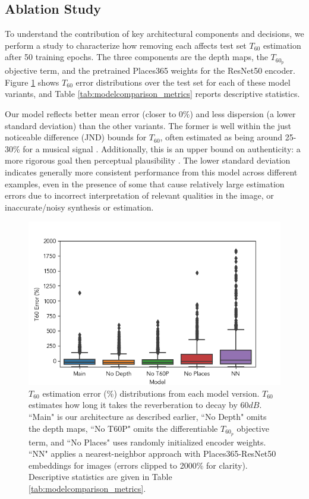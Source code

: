 \documentclass[10pt,twocolumn,letterpaper]{article}
\begin{document}
\subsection{Ablation Study}
To understand the contribution of key architectural components and decisions, we perform a study to characterize how removing each affects test set $T_{60}$ estimation after 50 training epochs. The three components are the depth maps, the $T_{60_p}$ objective term, and the pretrained Places365 weights for the ResNet50 encoder. Figure \ref{fig:models_comparison} shows $T_{60}$ error distributions over the test set for each of these model variants, and Table \ref{tab:modelcomparison_metrics} reports descriptive statistics.

Our model reflects better mean error (closer to 0\%) and less dispersion (a lower standard deviation) than the other variants. The former is well within the just noticeable difference (JND) bounds for $T_{60}$, often estimated as being around 25-30\% for a musical signal \cite{jndt60}. Additionally, this is an upper bound on authenticity: a more rigorous goal then perceptual plausibility \cite{pellegrini2001quality}. The lower standard deviation indicates generally more consistent performance from this model across different examples, even in the presence of some that cause relatively large estimation errors due to incorrect interpretation of relevant qualities in the image, or inaccurate/noisy synthesis or estimation.

\begin{figure}
    \centering
    \includegraphics[width=\columnwidth]{t60_errord.png}
    \caption{$T_{60}$ estimation error (\%) distributions from each model version. $T_{60}$ estimates how long it takes the reverberation to decay by $60dB$. ``Main" is our architecture as described earlier, ``No Depth" omits the depth maps, ``No T60P" omits the differentiable $T_{60_p}$ objective term, and ``No Places" uses randomly initialized encoder weights. ``NN" applies a nearest-neighbor approach with Places365-ResNet50 embeddings for images (errors clipped to 2000\% for clarity). Descriptive statistics are given in Table \ref{tab:modelcomparison_metrics}.}
    \label{fig:models_comparison}
\end{figure}
\end{document}
